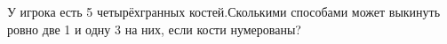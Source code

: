 \question 
У игрока есть 5 четырёхгранных костей.Сколькими способами может выкинуть ровно две 1 и одну 3 на них, если кости нумерованы?
